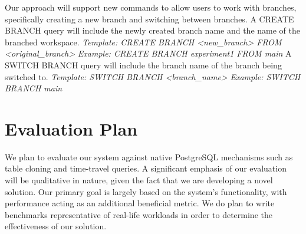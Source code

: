 \documentclass[sigplan, nonacm]{acmart}
\begin{document}
Our approach will support new commands to allow users to work with branches, specifically creating a new branch and switching between branches. A CREATE BRANCH query will include the newly created branch name and the name of the branched workspace.
\newline \newline
\textit{Template: CREATE BRANCH <new\_branch> FROM <original\_branch>}
\newline 
\textit{Example: CREATE BRANCH experiment1 FROM main}
\newline \newline
A SWITCH BRANCH query will include the branch name of the branch being switched to.
\newline \newline
\textit{Template: SWITCH BRANCH <branch\_name>}
\newline 
\textit{Example: SWITCH BRANCH main}



\section{Evaluation Plan}

We plan to evaluate our system against native PostgreSQL mechanisms such as table cloning and time-travel queries. A significant emphasis of our evaluation will be qualitative in nature, given the fact that we are developing a novel solution. Our primary goal is largely based on the system's functionality, with performance acting as an additional beneficial metric. We do plan to write benchmarks representative of real-life workloads in order to determine the effectiveness of our solution.





\pagestyle{plain}
\end{document}
